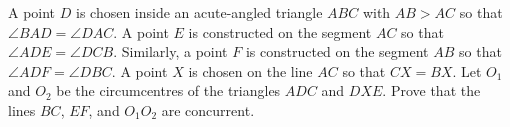 A point $D$ is chosen inside an acute-angled triangle $ABC$ with $AB > AC$ so that $\angle BAD = \angle DAC$. A point $E$ is constructed on the segment $AC$ so that $\angle ADE = \angle DCB$. Similarly, a point $F$ is constructed on the segment $AB$ so that $\angle ADF = \angle DBC$. A point $X$ is chosen on the line $AC$ so that $CX = BX$. Let $O_1$ and $O_2$ be the circumcentres of the triangles $ADC$ and $DXE$. Prove that the lines $BC$, $EF$, and $O_1 O_2$ are concurrent.
